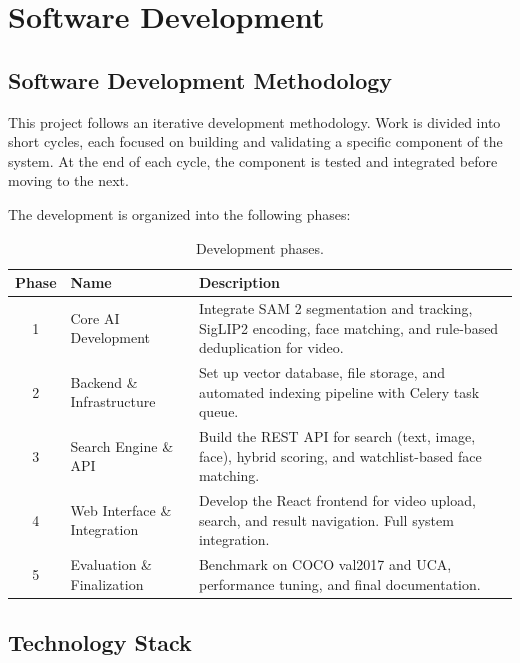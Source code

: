 \chapter{Software Development}
\label{chap:software-development}

\section{Software Development Methodology}
\label{section:software-development-methodology}

This project follows an iterative development methodology. Work is divided into short cycles, each focused on building and validating a specific component of the system. At the end of each cycle, the component is tested and integrated before moving to the next.

The development is organized into the following phases:

\begin{table}[H]
    \centering
    \begin{tabularx}{\textwidth}{c l X}
        \toprule
        \textbf{Phase} & \textbf{Name} & \textbf{Description} \\
        \midrule
        1 & Core AI Development & Integrate SAM 2 segmentation and tracking, SigLIP2 encoding, face matching, and rule-based deduplication for video. \\[6pt]
        2 & Backend \& Infrastructure & Set up vector database, file storage, and automated indexing pipeline with Celery task queue. \\[6pt]
        3 & Search Engine \& API & Build the REST API for search (text, image, face), hybrid scoring, and watchlist-based face matching. \\[6pt]
        4 & Web Interface \& Integration & Develop the React frontend for video upload, search, and result navigation. Full system integration. \\[6pt]
        5 & Evaluation \& Finalization & Benchmark on COCO val2017 and UCA, performance tuning, and final documentation. \\
        \bottomrule
    \end{tabularx}
    \caption{Development phases.}
    \label{tab:dev-phases}
\end{table}

\section{Technology Stack}
\label{section:technology-stack}

